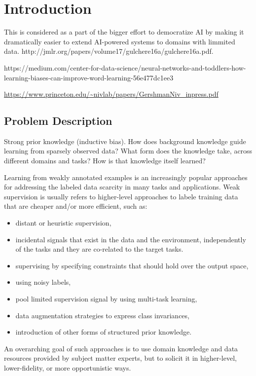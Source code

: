 \chapter{Introduction}


This is considered as a part of the bigger effort to democratize AI by making it dramatically easier to extend AI-powered systems to domains with limmited data.
http://jmlr.org/papers/volume17/gulchere16a/gulchere16a.pdf.

https://medium.com/center-for-data-science/neural-networks-and-toddlers-how-learning-biases-can-improve-word-learning-56e477dc1ee3


\url{https://www.princeton.edu/~nivlab/papers/GershmanNiv_inpress.pdf}

\section{Problem Description}

Strong prior knowledge (inductive bias). How does background knowledge guide learning from sparsely observed data?  What form does the knowledge take, across different domains and tasks?
How is that knowledge itself learned? 

Learning from weakly annotated examples is an increasingly popular approaches for addressing the labeled data scarcity in many tasks and applications. 
Weak supervision is usually refers to higher-level approaches to labele training data that are cheaper and/or more efficient, such as:
\begin{itemize}
    \item distant or heuristic supervision,
    \item incidental signals that  exist in the data and the environment, independently of the tasks and they are co-related to the target tasks.
    \item supervising by specifying constraints that should hold over the output space,
    \item using noisy labels, 
    \item pool limited supervision signal by using multi-task learning,
    \item data augmentation strategies to express class invariances,
    \item introduction of other forms of structured prior knowledge.
\end{itemize}
An overarching goal of such approaches is to use domain knowledge and data resources provided by subject matter experts, but to solicit it in higher-level, lower-fidelity, or more opportunistic ways.

